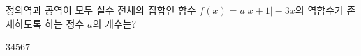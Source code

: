 \hspace*{2mm}\begin{minipage}[t]{\dimexpr\linewidth-2mm\relax}\vspace{0pt}
정의역과 공역이 모두 실수 전체의 집합인 함수 $f(x)=a|x+1|-3x$의 역함수가 존재하도록 하는 정수 $a$의 개수는?
\begin{choices32}{$3$}{$4$}{$5$}{$6$}{$7$}\end{choices32}\end{minipage}
